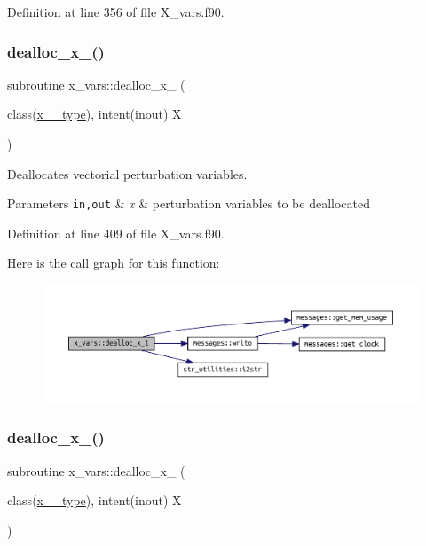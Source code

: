 Definition at line 356 of file X\+\_\+vars.\+f90.

\mbox{\label{namespacex__vars_a20679fb70a3dbfcdf2479b1219b847d1}} 
\subsubsection{\texorpdfstring{dealloc\+\_\+x\+\_()}{dealloc\_x\_1()}}
{\footnotesize\ttfamily subroutine x\+\_\+vars\+::dealloc\+\_\+x\+\_ (\begin{DoxyParamCaption}\item[{class(\hyperlink{structx__vars_1_1x__1__type}{x\+\_\+1\+\_\+type}), intent(inout)}]{X }\end{DoxyParamCaption})}



Deallocates vectorial perturbation variables. 


\begin{DoxyParams}[1]{Parameters}
\mbox{\tt in,out}  & {\em x} & perturbation variables to be deallocated \\
\hline
\end{DoxyParams}


Definition at line 409 of file X\+\_\+vars.\+f90.

Here is the call graph for this function\+:\nopagebreak
\begin{figure}[H]
\begin{center}
\leavevmode
\includegraphics[width=350pt]{namespacex__vars_a20679fb70a3dbfcdf2479b1219b847d1_cgraph}
\end{center}
\end{figure}
\mbox{\label{namespacex__vars_ac052defbe764e6d02f436bd29d72db6d}} 
\subsubsection{\texorpdfstring{dealloc\+\_\+x\+\_()}{dealloc\_x\_2()}}
{\footnotesize\ttfamily subroutine x\+\_\+vars\+::dealloc\+\_\+x\+\_ (\begin{DoxyParamCaption}\item[{class(\hyperlink{structx__vars_1_1x__2__type}{x\+\_\+2\+\_\+type}), intent(inout)}]{X }\end{DoxyParamCaption})}



